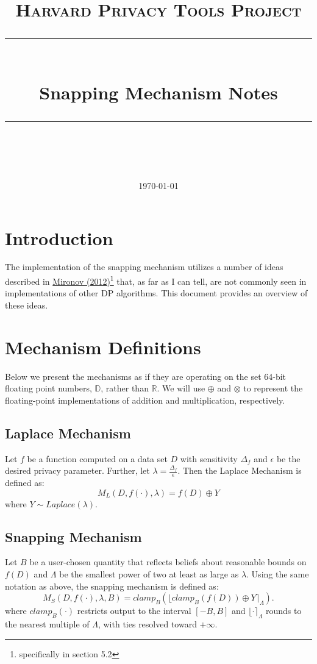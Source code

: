 \documentclass[11pt]{scrartcl} %
\title{
	\normalfont\normalsize
	\textsc{Harvard Privacy Tools Project}\\ %
	\vspace{25pt} %
	\rule{\linewidth}{0.5pt}\\ %
	\vspace{20pt} %
	{\huge Snapping Mechanism Notes}\\ %
	\vspace{12pt} %
	\rule{\linewidth}{2pt}\\ %
	\vspace{12pt} %
}
\date{\normalsize\today} %
\begin{document}
\maketitle %

\section{Introduction}
The implementation of the snapping mechanism utilizes a number of ideas described in \href{http://citeseerx.ist.psu.edu/viewdoc/download?doi=10.1.1.366.5957&rep=rep1&type=pdf}{Mironov (2012)}\footnote{specifically in section 5.2} that, as far as I can tell, are not commonly seen in implementations of other DP algorithms. This document provides an overview of these ideas. \newline

\section{Mechanism Definitions}
Below we present the mechanisms as if they are operating on the set 64-bit floating point numbers, $\mathbb{D}$, rather than $\mathbb{R}$. We will use $\oplus$ and $\otimes$ to represent the floating-point implementations of addition and multiplication, respectively.

\subsection{Laplace Mechanism}
\label{subsec:laplace}
Let $f$ be a function computed on a data set $D$ with sensitivity $\Delta_f$ and $\epsilon$ be the desired privacy parameter. Further, let $\lambda = \frac{\Delta_f}{\epsilon}$. Then the Laplace Mechanism is defined as:
\[ M_{L}(D, f(\cdot), \lambda) = f(D) \oplus Y \]
where $Y \sim Laplace(\lambda)$.

\subsection{Snapping Mechanism}
\label{subsec:snapping}
Let $B$ be a user-chosen quantity that reflects beliefs about reasonable bounds on $f(D)$ and $\Lambda$ be the smallest power of two at least as large as $\lambda$. Using the same notation as above, the snapping mechanism is defined as:
\[ M_{S}(D, f(\cdot), \lambda, B) = clamp_{B}\left( \lfloor clamp_{B}\left( f(D) \right) \oplus Y \rceil_{\Lambda} \right). \]
where $clamp_{B}(\cdot)$ restricts output to the interval $[-B, B]$ and $\lfloor \cdot \rceil_{\Lambda}$ rounds to the nearest multiple of $\Lambda$, with ties resolved toward $+ \infty$.
\end{document}
